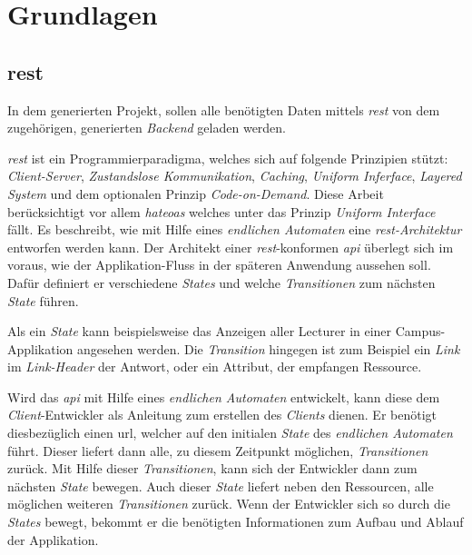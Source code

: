 \chapter{Grundlagen}\label{ch:basics}
\section{\acf{rest}}\label{sec:rest}
In dem generierten Projekt, sollen alle benötigten Daten mittels \textit{\ac{rest}} von dem zugehörigen, generierten \textit{Backend} geladen werden. 

 \textit{\ac{rest}} \cite{rest_fielding} ist ein Programmierparadigma, welches sich auf folgende Prinzipien stützt: \textit{Client-Server}, \textit{Zustandslose Kommunikation}, \textit{Caching}, \textit{Uniform Inferface}, \textit{Layered System} und dem optionalen Prinzip \textit{Code-on-Demand}.
Diese Arbeit berücksichtigt vor allem \textit{\acf{hateoas}} welches unter das Prinzip \textit{Uniform Interface} fällt. Es beschreibt, wie mit Hilfe eines \textit{endlichen Automaten} eine \textit{\ac{rest}-Architektur} entworfen werden kann.
Der Architekt einer \textit{\ac{rest}}-konformen \textit{\acf{api}} überlegt sich im voraus, wie der Applikation-Fluss in der späteren Anwendung aussehen soll. Dafür definiert er verschiedene \textit{States} und welche \textit{Transitionen} zum nächsten \textit{State} führen.

Als ein \textit{State} kann beispielsweise das Anzeigen aller Lecturer in einer Campus-Applikation angesehen werden.
Die \textit{Transition} hingegen ist zum Beispiel ein \textit{Link} im \textit{Link-Header} der Antwort, oder ein Attribut, der empfangen Ressource. 

Wird das \textit{\ac{api}} mit Hilfe eines \textit{endlichen Automaten} entwickelt, kann diese dem \textit{Client}-Entwickler als Anleitung zum erstellen des \textit{Clients} dienen. Er benötigt diesbezüglich einen \acf{url}, welcher auf den initialen \textit{State} des \textit{endlichen Automaten} führt. Dieser liefert dann alle, zu diesem Zeitpunkt möglichen, \textit{Transitionen} zurück. Mit Hilfe dieser \textit{Transitionen}, kann sich der Entwickler dann zum nächsten \textit{State} bewegen. Auch dieser \textit{State} liefert neben den Ressourcen, alle möglichen weiteren \textit{Transitionen} zurück. 
Wenn der Entwickler sich so durch die \textit{States} bewegt, bekommt er die benötigten Informationen zum Aufbau und Ablauf der Applikation.

